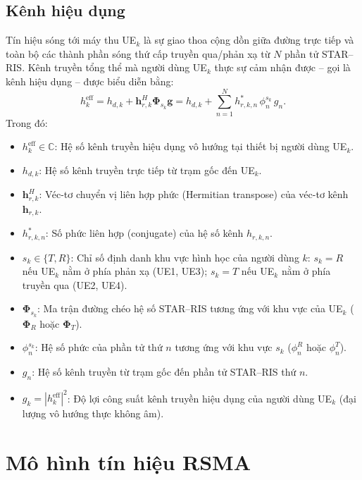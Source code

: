 \subsection{Kênh hiệu dụng}
\label{ssec:kenh-hieu-dung}

Tín hiệu sóng tới máy thu UE$_k$ là sự giao thoa cộng dồn giữa đường trực tiếp và toàn bộ các thành phần sóng
thứ cấp truyền qua/phản xạ từ $N$ phần tử STAR--RIS. Kênh truyền tổng thể mà người dùng UE$_k$ thực sự cảm
nhận được -- gọi là kênh hiệu dụng -- được biểu diễn bằng:
\begin{equation}
h^{\mathrm{eff}}_k = h_{d,k} + \mathbf{h}_{r,k}^H \boldsymbol{\Phi}_{s_k} \mathbf{g}
= h_{d,k} + \sum_{n=1}^{N} h^{*}_{r,k,n}\, \phi^{s_k}_n\, g_n .
\label{eq:kenh-hieu-dung}
\end{equation}
Trong đó:
\begin{itemize}
\item $h^{\mathrm{eff}}_k \in \mathbb{C}$: Hệ số kênh truyền hiệu dụng vô hướng tại thiết bị người dùng UE$_k$.
\item $h_{d,k}$: Hệ số kênh truyền trực tiếp từ trạm gốc đến UE$_k$.
\item $\mathbf{h}_{r,k}^H$: Véc-tơ chuyển vị liên hợp phức (Hermitian transpose) của véc-tơ kênh
  $\mathbf{h}_{r,k}$.
\item $h^{*}_{r,k,n}$: Số phức liên hợp (conjugate) của hệ số kênh $h_{r,k,n}$.
\item $s_k \in \{T, R\}$: Chỉ số định danh khu vực hình học của người dùng $k$: $s_k = R$ nếu UE$_k$ nằm ở
  phía phản xạ (UE1, UE3); $s_k = T$ nếu UE$_k$ nằm ở phía truyền qua (UE2, UE4).
\item $\boldsymbol{\Phi}_{s_k}$: Ma trận đường chéo hệ số STAR--RIS tương ứng với khu vực của UE$_k$
  ($\boldsymbol{\Phi}_R$ hoặc $\boldsymbol{\Phi}_T$).
\item $\phi^{s_k}_n$: Hệ số phức của phần tử thứ $n$ tương ứng với khu vực $s_k$ ($\phi^R_n$ hoặc $\phi^T_n$).
\item $g_n$: Hệ số kênh truyền từ trạm gốc đến phần tử STAR--RIS thứ $n$.
\item $g_k = |h^{\mathrm{eff}}_k|^2$: Độ lợi công suất kênh truyền hiệu dụng của người dùng UE$_k$ (đại lượng
  vô hướng thực không âm).
\end{itemize}

\section{Mô hình tín hiệu RSMA}
\label{sec:mo-hinh-rsma}

